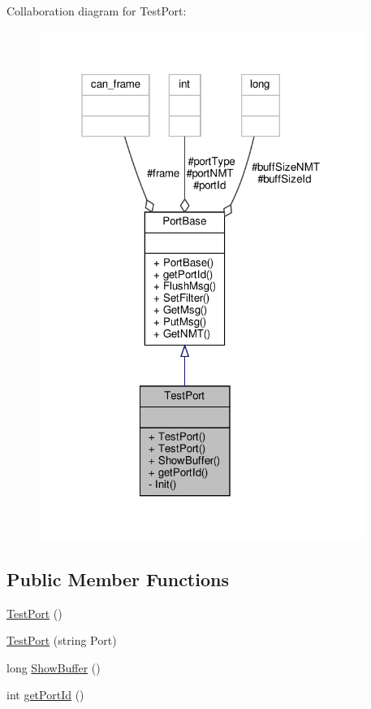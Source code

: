 Collaboration diagram for Test\+Port\+:
\nopagebreak
\begin{figure}[H]
\begin{center}
\leavevmode
\includegraphics[width=301pt]{classTestPort__coll__graph}
\end{center}
\end{figure}
\subsection*{Public Member Functions}
\begin{DoxyCompactItemize}
\item 
\hyperlink{classTestPort_adde46780527e08b738eb5b32defa1c3a}{Test\+Port} ()
\item 
\hyperlink{classTestPort_a93293d14818c76db0b4ef1273cf5ce19}{Test\+Port} (string Port)
\item 
long \hyperlink{classTestPort_acc9bf1db6c1ca7d9040591306100ab36}{Show\+Buffer} ()
\item 
int \hyperlink{classTestPort_abf6a7327e26838aaf3e2e4482668085f}{get\+Port\+Id} ()
\end{DoxyCompactItemize}
